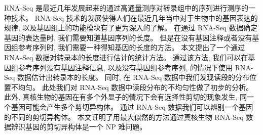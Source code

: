 
\secretlevel{} \secretyear{}

\makeatletter
\ifthu@bachelor\relax\else
  \ifthu@doctor
  \else
    \ifthu@master
    \fi
  \fi
\fi
\makeatother





\begin{cabstract}
	RNA-Seq 是最近几年发展起来的通过高通量测序对转录组中的序列进行测序的一种技术。 
	RNA-Seq 技术的发展使得人们在最近几年当中对于生物中的基因表达的规律, 
	以及基因组上的功能模块有了更为深入的了解。 
	在通过 RNA-Seq 数据确定基因的表达量时, 我们需要知道基因序列的长度。 
	但是在没有基因注释或者没有基因组参考序列时, 我们需要一种得知基因的长度的方法。
	本文提出了一个通过 RNA-Seq 数据对转录本的长度进行估计的统计方法。 
	通过该方法, 我们可以在基因组参考序列没有基因注释信息, 以及没有基因组参考序列, 
	的情况下使用 RNA-Seq 数据估计出转录本的长度。
	同时, 在 RNA-Seq 数据中我们发现读段的分布位置不均匀。
	此处我们对 RNA-Seq 数据中读段分布的不均匀性做了初步的分析。
	此外, 真核生物的基因在有多个外显子的情况下会有选择性剪切的现象发生, 
	同一个基因可能会产生多个剪切异构体。
	通过 RNA-Seq 数据我们可以辨别一个基因的不同的剪切异构体。
	本文证明了用最大似然的方法通过真核生物 RNA-Seq 数据辨识基因的剪切异构体是一个 NP 难问题。
\end{cabstract}

